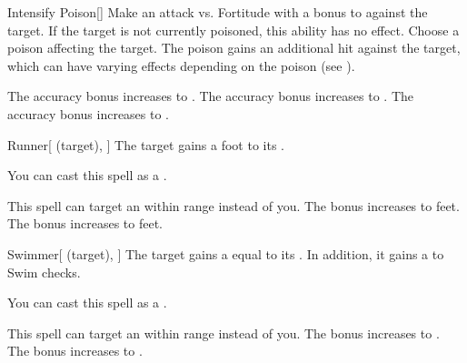 \lowercase{\hypertarget{spell:Intensify Poison}{}}\label{spell:Intensify Poison}
\begin{freeability}[Rank 2]{\hypertarget{spell:Intensify Poison}{Intensify Poison}}[]
Make an attack vs. Fortitude with a  bonus to  against the target.
If the target is not currently poisoned, this ability has no effect.
\hit Choose a poison affecting the target.
The poison gains an additional hit against the target, which can have varying effects depending on the poison (see ).

\rankline
{} The accuracy bonus increases to .
 The accuracy bonus increases to .
 The accuracy bonus increases to .

\end{freeability}
\vspace{0.25em}



\lowercase{\hypertarget{spell:Runner}{}}\label{spell:Runner}
\begin{attuneability}[Rank 2]{\hypertarget{spell:Runner}{Runner}}[ (target), ]
The target gains a  foot  to its .

You can cast this spell as a .

\rankline
{} This spell can target an  within \rngmed range instead of you.
 The bonus increases to  feet.
 The bonus increases to  feet.

\end{attuneability}
\vspace{0.25em}



\lowercase{\hypertarget{spell:Swimmer}{}}\label{spell:Swimmer}
\begin{attuneability}[Rank 2]{\hypertarget{spell:Swimmer}{Swimmer}}[ (target), ]
The target gains a  equal to its .
In addition, it gains a   to Swim checks.

You can cast this spell as a .

\rankline
{} This spell can target an  within \rngmed range instead of you.
 The bonus increases to .
 The bonus increases to .

\end{attuneability}
\vspace{0.25em}




